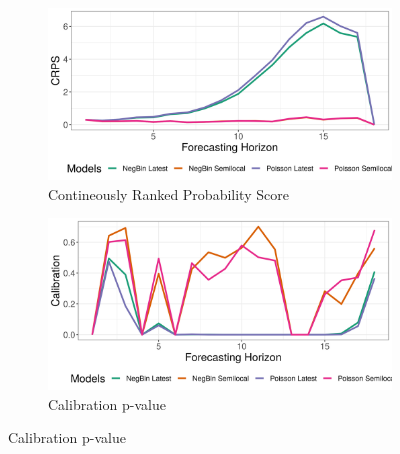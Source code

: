 \begin{figure}[H]
\begin{subfigure}{0.5\textwidth}
  \centering
  \includegraphics[width=\linewidth]{../output/Mwenga_crps.png}  
  \caption{Contineously Ranked Probability Score}
  \label{Mwenga_scores_1}
\end{subfigure}
\begin{subfigure}{0.5\textwidth}
  \centering
  \includegraphics[width=\linewidth]{../output/Mwenga_calibration.png}  
  \caption{Calibration p-value}
  \label{Mwenga_scores_2}
\end{subfigure}


\end{figure}
